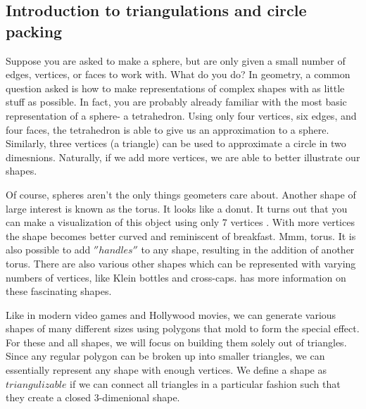 \documentclass[12pt]{article}
\begin{document}
  \subsection{Introduction to triangulations and circle packing}
  \maketitle
  Suppose you are asked to make a sphere, but are only given a small number of edges, vertices, or faces to work with. What do you do? In geometry, a common question asked is how to make representations of complex shapes with as little stuff as possible. In fact, you are probably already familiar with the most basic representation of a sphere- a tetrahedron. Using only four vertices, six edges, and four faces, the tetrahedron is able to give us an approximation to a sphere. Similarly, three vertices (a triangle) can be used to approximate a circle in two dimesnions. Naturally, if we add more vertices, we are able to better illustrate our shapes. \newline
  
   \noindent Of course, spheres aren't the only things geometers care about. Another shape of large interest is known as the torus. It looks like a donut. It turns out that you can make a visualization of this object using only 7 vertices \cite{lutzmanifold}. With more vertices the shape becomes better curved and reminiscent of breakfast. Mmm, torus. It is also possible to add $''handles''$ to any shape, resulting in the addition of another torus. There are also various other shapes which can be represented with varying numbers of vertices, like Klein bottles and cross-caps.\cite{WolfMath} has more information on these fascinating shapes.\newline
   
   \noindent Like in modern video games and Hollywood movies, we can generate various shapes of many different sizes using polygons that mold to form the special effect. For these and all shapes, we will focus on building them solely out of triangles. Since any regular polygon can be broken up into smaller triangles, we can essentially represent any shape with enough vertices. We define a shape as $triangulizable$ if we can connect all triangles in a particular fashion such that they create a closed 3-dimenional shape.\newline
  
\end{document}
